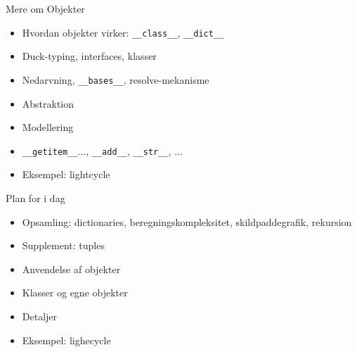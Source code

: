 \documentclass[a4paper,landscape]{slides}
\begin{document}
\begin{slide}
	\begin{center} {\large 
            Mere om Objekter
	} \end{center}
	\begin{itemize} \addtolength{\itemsep}{-\baselineskip}
		\item Hvordan objekter virker: \verb|__class__|, \verb|__dict__| 
                \item Duck-typing, interfaces, klasser
                \item Nedarvning, \verb|__bases__|, resolve-mekanisme
                \item Abstraktion
                \item Modellering
                \item \verb|__getitem__|..., \verb|__add__|, \verb|__str__|, ...
                \item Eksempel: lightcycle
	\end{itemize}
\end{slide}

\begin{slide}
	\begin{center} {\large 
            Plan for i dag
	} \end{center}
	\begin{itemize} \addtolength{\itemsep}{-\baselineskip}
		\item Opsamling: dictionaries, beregningskompleksitet, skildpaddegrafik, rekursion
		\item Supplement: tuples
                \item Anvendelse af objekter
		\item Klasser og egne objekter
		\item Detaljer
                \item Eksempel: lighecycle
	\end{itemize}
\end{slide}
\end{document}
